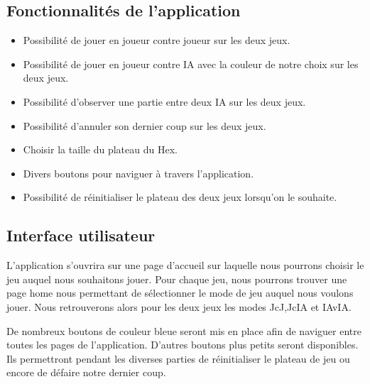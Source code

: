 \subsection*{Fonctionnalités de l'application}
\begin{itemize}
    \item Possibilité de jouer en joueur contre joueur sur les deux jeux.
    \item Possibilité de jouer en joueur contre IA avec la couleur de notre choix sur les deux jeux.
    \item Possibilité d'observer une partie entre deux IA sur les deux jeux.
    \item Possibilité d'annuler son dernier coup sur les deux jeux.
    \item Choisir la taille du plateau du Hex. 
    \item Divers boutons pour naviguer à travers l'application.
    \item Possibilité de réinitialiser le plateau des deux jeux lorsqu'on le souhaite.
\end{itemize}

\subsection*{Interface utilisateur}
L'application s'ouvrira sur une page d'accueil sur laquelle nous pourrons choisir le jeu auquel nous souhaitons jouer.
Pour chaque jeu, nous pourrons trouver une page home nous permettant de sélectionner le mode de jeu auquel nous voulons
jouer. Nous retrouverons alors pour les deux jeux les modes JcJ,JcIA et IAvIA.

De nombreux boutons de couleur bleue seront mis en place afin de naviguer entre toutes les pages de l'application. D'autres
boutons plus petits seront disponibles. Ils permettront pendant les diverses parties de réinitialiser le plateau de jeu ou encore de défaire 
notre dernier coup.


